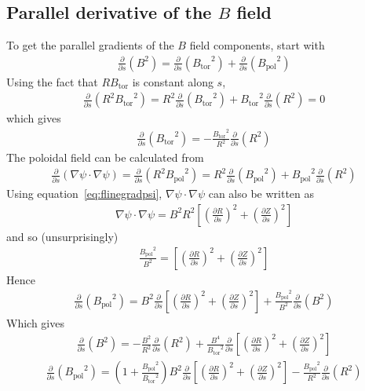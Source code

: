 \documentclass[12pt]{article}
\newcommand{\deriv}[2]{\ensuremath{\frac{\partial #1}{\partial #2}}}
\newcommand{\Bp}{\ensuremath{B_{\text{pol}}}}
\newcommand{\Bt}{\ensuremath{B_{\text{tor}}}}
\begin{document}
\subsection{Parallel derivative of the \texorpdfstring{$B$}{B} field}
To get the parallel gradients of the $B$ field components, start with
%
\begin{align*}
\deriv{}{s}\left(B^2\right) = \deriv{}{s}\left(\Bt^2\right) +
\deriv{}{s}\left(\Bp^2\right)
\end{align*}
%
Using the fact that $R\Bt$ is constant along $s$,
%
\begin{align*}
\deriv{}{s}\left(R^2\Bt^2\right) = R^2\deriv{}{s}\left(\Bt^2\right) +
\Bt^2\deriv{}{s}\left(R^2\right) = 0
\end{align*}
%
which gives
%
\begin{align*}
  \deriv{}{s}\left(\Bt^2\right) = -\frac{\Bt^2}{R^2}\deriv{}{s}\left(R^2\right)
\end{align*}
%
The poloidal field can be calculated from
%
\begin{align*}
\deriv{}{s}\left(\nabla\psi \cdot \nabla\psi\right) =
\deriv{}{s}\left(R^2\Bp^2\right) = R^2\deriv{}{s}\left(\Bp^2\right) +
\Bp^2\deriv{}{s}\left(R^2\right)
\end{align*}
%
Using equation~\ref{eq:flinegradpsi}, $\nabla\psi \cdot \nabla\psi$ can also be
written as
%
\begin{align*}
\nabla\psi \cdot \nabla\psi = B^2R^2\left[\left(\deriv{R}{s}\right)^2 +
\left(\deriv{Z}{s}\right)^2\right]
\end{align*}
%
and so (unsurprisingly)
%
\begin{align*}
\frac{\Bp^2}{B^2} = \left[\left(\deriv{R}{s}\right)^2 +
\left(\deriv{Z}{s}\right)^2\right]
\end{align*}
%
Hence
%
\begin{align*}
\deriv{}{s}\left(\Bp^2\right) = B^2\deriv{}{s}\left[\left(\deriv{R}{s}\right)^2
+ \left(\deriv{Z}{s}\right)^2\right] +
\frac{\Bp^2}{B^2}\deriv{}{s}\left(B^2\right)
\end{align*}
%
Which gives
%
\begin{align*}
\deriv{}{s}\left(B^2\right) = -\frac{B^2}{R^2}\deriv{}{s}\left(R^2\right) +
\frac{B^4}{\Bt^2}\deriv{}{s}\left[\left(\deriv{R}{s}\right)^2 +
\left(\deriv{Z}{s}\right)^2\right]
\end{align*}
%
%
\begin{align*}
\deriv{}{s}\left(\Bp^2\right) = \left(1 +
\frac{\Bp^2}{\Bt^2}\right)B^2\deriv{}{s}\left[\left(\deriv{R}{s}\right)^2 +
\left(\deriv{Z}{s}\right)^2\right] -
\frac{\Bp^2}{R^2}\deriv{}{s}\left(R^2\right)
\end{align*}
\end{document}
